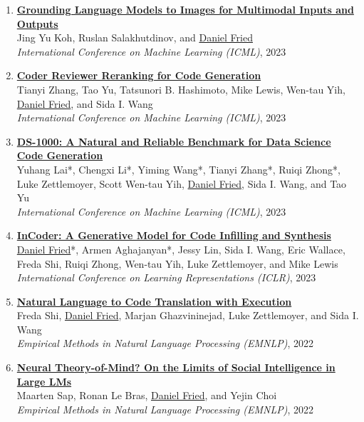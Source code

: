 \begin{enumerate}[leftmargin=-1mm,partopsep=0pt]
  \item \href{https://arxiv.org/abs/2301.13823}{\textbf{Grounding Language Models to Images for Multimodal Inputs and Outputs}} \\
    Jing Yu Koh, Ruslan Salakhutdinov, and \underline{Daniel Fried} \\
    \emph{International Conference on Machine Learning (ICML)}, 2023

  \item \href{https://arxiv.org/abs/2211.16490}{\textbf{Coder Reviewer Reranking for Code Generation}} \\
    Tianyi Zhang, Tao Yu, Tatsunori B. Hashimoto, Mike Lewis, Wen-tau Yih, \underline{Daniel Fried}, and Sida I. Wang \\
    \emph{International Conference on Machine Learning (ICML)}, 2023

  \item \href{https://arxiv.org/abs/2211.11501}{\textbf{DS-1000: A Natural and Reliable Benchmark for Data Science Code Generation}} \\
    Yuhang Lai*, Chengxi Li*, Yiming Wang*, Tianyi Zhang*, Ruiqi Zhong*, Luke Zettlemoyer, Scott Wen-tau Yih, \underline{Daniel Fried}, Sida I. Wang, and Tao Yu \\
    \emph{International Conference on Machine Learning (ICML)}, 2023

  \item \href{https://arxiv.org/abs/2204.05999}{\textbf{InCoder: A Generative Model for Code Infilling and Synthesis}} \\
    \underline{Daniel Fried}*, Armen Aghajanyan*, Jessy Lin, Sida I. Wang, Eric Wallace, Freda Shi, Ruiqi Zhong, Wen-tau Yih, Luke Zettlemoyer, and Mike Lewis \\
      \emph{International Conference on Learning Representations (ICLR)}, 2023

\item \href{https://arxiv.org/abs/2204.11454}{\textbf{Natural Language to Code Translation with Execution}} \\
  Freda Shi, \underline{Daniel Fried}, Marjan Ghazvininejad, Luke Zettlemoyer, and Sida I. Wang \\
  \emph{Empirical Methods in Natural Language Processing (EMNLP)}, 2022

\item \href{https://arxiv.org/abs/2210.13312}{\textbf{Neural Theory-of-Mind? On the Limits of Social Intelligence in Large LMs}} \\
  Maarten Sap, Ronan Le Bras, \underline{Daniel Fried}, and Yejin Choi  \\
  \emph{Empirical Methods in Natural Language Processing (EMNLP)}, 2022


\end{enumerate}
